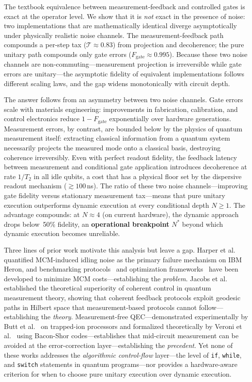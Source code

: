\documentclass[11pt]{article}
\begin{document}
The textbook equivalence between measurement-feedback and controlled gates is exact at the operator level.
We show that it is \emph{not} exact in the presence of noise: two implementations that are mathematically identical diverge asymptotically under physically realistic noise channels.
The measurement-feedback path compounds a per-step tax ($\mathcal{T} \approx 0.83$) from projection and decoherence; the pure unitary path compounds only gate errors ($F_{\text{gate}} \approx 0.995$).
Because these two noise channels are non-commuting---measurement projection is irreversible while gate errors are unitary---the asymptotic fidelity of equivalent implementations follows different scaling laws, and the gap widens monotonically with circuit depth.

The answer follows from an asymmetry between two noise channels.
Gate errors scale with materials engineering: improvements in fabrication, calibration, and control electronics reduce $1 - F_\text{gate}$ exponentially over hardware generations.
Measurement errors, by contrast, are bounded below by the physics of quantum measurement itself: extracting classical information from a quantum system necessarily projects the measured mode onto a classical basis, destroying coherence irreversibly.
Even with perfect readout fidelity, the feedback latency between measurement and conditional gate application introduces decoherence at rate $1/T_2$ in all idle qubits, a cost that has a physical floor set by the dispersive readout mechanism ($\gtrsim 100\,$ns).
The ratio of these two noise channels---improving gate fidelity versus stationary measurement tax---means that pure unitary execution outperforms dynamic execution at every conditional depth $N \geq 1$.
The advantage compounds: at $N \approx 4$ (on current hardware), the dynamic approach drops below~50\% fidelity, an \textbf{operational breakpoint} $N^*$ beyond which dynamic execution becomes unreliable.

Three lines of prior work motivate this analysis but leave a gap.
Harper et al.~\cite{harper2026} quantified MCM-induced idling noise as the primary failure mechanism on IBM Heron, and benchmarking protocols~\cite{hothem2025} and optimization frameworks~\cite{mcm_opt2025} have been developed to minimize MCM costs---establishing the \emph{problem}.
Jacobs et al.~\cite{jacobs2014} established the theoretical superiority of coherent control in quantum measurement theory, showing that coherent feedback protocols exploit geodesic paths in Hilbert space that measurement-based protocols cannot follow---establishing the \emph{theory}.
Measurement-free QEC---demonstrated experimentally by Butt et al.~\cite{butt2026} on trapped-ion processors and formalized theoretically by Veroni et al.~\cite{veroni2025} using Bacon-Shor codes---establishes that mid-circuit measurement can be avoided at the error-correction layer---establishing the \emph{precedent}.
Yet none of these works addresses the \emph{algorithmic control-flow} layer---the level of \texttt{if}, \texttt{while}, and \texttt{switch} statements in quantum programs---nor provides a hardware-aware criterion for when to choose pure unitary execution over dynamic execution.
\end{document}
